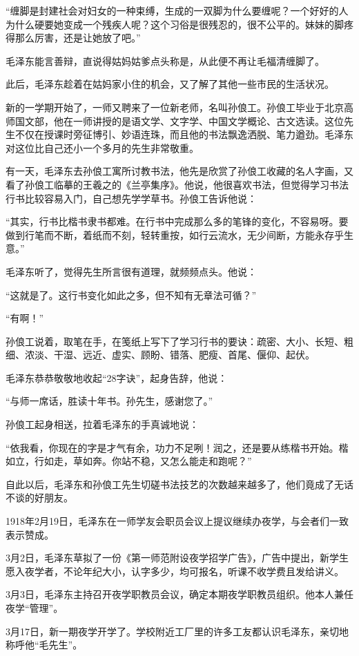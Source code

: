 \documentclass[../../dazhuan.tex]{subfiles}
\begin{document}
“缠脚是封建社会对妇女的一种束缚，生成的一双脚为什么要缠呢？一个好好的人为什么硬要她变成一个残疾人呢？这个习俗是很残忍的，很不公平的。妹妹的脚疼得那么厉害，还是让她放了吧。”

毛泽东能言善辩，直说得姑妈姑爹点头称是，从此便不再让毛福清缠脚了。

此后，毛泽东趁着在姑妈家小住的机会，又了解了其他一些市民的生活状况。

新的一学期开始了，一师又聘来了一位新老师，名叫孙俍工。孙俍工毕业于北京高师国文部，他在一师讲授的是语文学、文字学、中国文学概论、古文选读。这位先生不仅在授课时旁征博引、妙语连珠，而且他的书法飘逸洒脱、笔力遒劲。毛泽东对这位比自己还小一个多月的先生非常敬重。

有一天，毛泽东去孙俍工寓所讨教书法，他先是欣赏了孙俍工收藏的名人字画，又看了孙俍工临摹的王羲之的《兰亭集序》。他说，他很喜欢书法，但觉得学习书法行书比较容易入门，自己想先学学草书。孙俍工告诉他说：

“其实，行书比楷书隶书都难。在行书中完成那么多的笔锋的变化，不容易呀。要做到行笔而不断，着纸而不刻，轻转重按，如行云流水，无少间断，方能永存乎生意。”

毛泽东听了，觉得先生所言很有道理，就频频点头。他说：

“这就是了。这行书变化如此之多，但不知有无章法可循？”

“有啊！”

孙俍工说着，取笔在手，在笺纸上写下了学习行书的要诀：疏密、大小、长短、粗细、浓淡、干湿、远近、虚实、顾盼、错落、肥瘦、首尾、偃仰、起伏。

毛泽东恭恭敬敬地收起“28字诀”，起身告辞，他说：

“与师一席话，胜读十年书。孙先生，感谢您了。”

孙俍工起身相送，拉着毛泽东的手真诚地说：

“依我看，你现在的字是才气有余，功力不足咧！润之，还是要从练楷书开始。楷如立，行如走，草如奔。你站不稳，又怎么能走和跑呢？”

自此以后，毛泽东和孙俍工先生切磋书法技艺的次数越来越多了，他们竟成了无话不谈的好朋友。

1918年2月19日，毛泽东在一师学友会职员会议上提议继续办夜学，与会者们一致表示赞成。

3月2日，毛泽东草拟了一份《第一师范附设夜学招学广告》，广告中提出，新学生愿入夜学者，不论年纪大小，认字多少，均可报名，听课不收学费且发给讲义。

3月3日，毛泽东主持召开夜学职教员会议，确定本期夜学职教员组织。他本人兼任夜学“管理”。

3月17日，新一期夜学开学了。学校附近工厂里的许多工友都认识毛泽东，亲切地称呼他“毛先生”。
\end{document}
